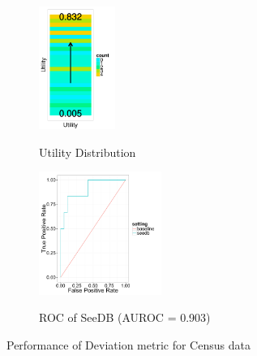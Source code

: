 

\begin{figure}[t]
	\centering
	\begin{subfigure}{0.32\linewidth}
		{\includegraphics[trim={0 1.3cm 0 0}, clip, width=2.5cm]{Images/census_gt_distribution.pdf}}
		\caption{Utility Distribution}
		\label{fig:gt_dist}
	\end{subfigure}
	\begin{subfigure}{0.65\linewidth}
		\centering 
		{\includegraphics[width=4cm] {Images/seedb_roc.pdf}} 
		\caption{ROC of SeeDB (AUROC = 0.903)}
		\label{fig:roc}
	\end{subfigure}
	\caption{Performance of Deviation metric for Census data}
	\vspace{-20pt}
	\label{fig:census_gt}
\end{figure}

